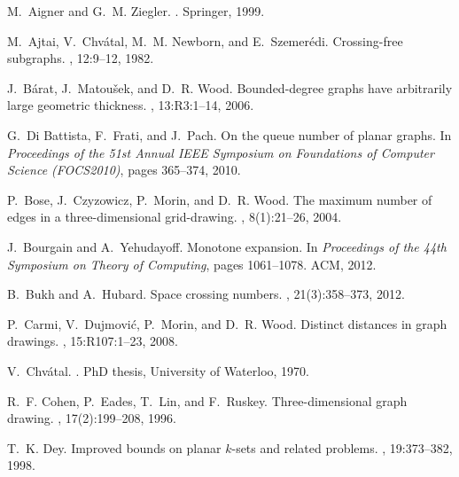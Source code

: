 \documentclass[12pt]{article}
\begin{document}
\begin{thebibliography}{10}

M.~Aigner and G.~M. Ziegler.
.
\newblock Springer, 1999.

M.~Ajtai, V.~Chv\'atal, M.~M. Newborn, and E.~Szemer\'edi.
\newblock Crossing-free subgraphs.
, 12:9--12, 1982.

J.~B\'arat, J.~Matou{\v{s}}ek, and D.~R. Wood.
\newblock Bounded-degree graphs have arbitrarily large geometric thickness.
, 13:R3:1--14, 2006.

G.~Di Battista, F.~Frati, and J.~Pach.
\newblock On the queue number of planar graphs.
\newblock In {\em Proceedings of the 51st Annual IEEE Symposium on Foundations
  of Computer Science (FOCS2010)}, pages 365--374, 2010.

P.~Bose, J.~Czyzowicz, P.~Morin, and D.~R. Wood.
\newblock The maximum number of edges in a three-dimensional grid-drawing.
, 8(1):21--26,
  2004.

J.~Bourgain and A.~Yehudayoff.
\newblock Monotone expansion.
\newblock In {\em Proceedings of the 44th Symposium on Theory of Computing},
  pages 1061--1078. ACM, 2012.

B.~Bukh and A.~Hubard.
\newblock Space crossing numbers.
, 21(3):358--373, 2012.

P.~Carmi, V.~Dujmovi\'c, P.~Morin, and D.~R. Wood.
\newblock Distinct distances in graph drawings.
, 15:R107:1--23, 2008.

V.~Chv\'atal.
.
\newblock PhD thesis, University of Waterloo, 1970.

R.~F. Cohen, P.~Eades, T.~Lin, and F.~Ruskey.
\newblock Three-dimensional graph drawing.
, 17(2):199--208, 1996.

T.~K. Dey.
\newblock Improved bounds on planar $k$-sets and related problems.
, 19:373--382, 1998.


\end{thebibliography}
\end{document}
